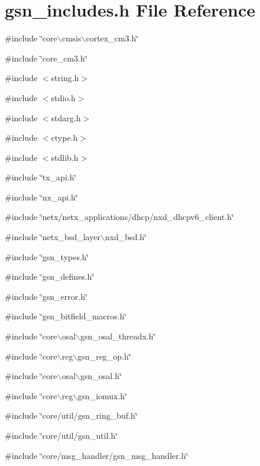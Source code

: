 \hypertarget{a00518}{
\section{gsn\_\-includes.h File Reference}
\label{a00518}
}
{\ttfamily \#include \char`\"{}core$\backslash$cmsis$\backslash$cortex\_\-cm3.h\char`\"{}}\par
{\ttfamily \#include \char`\"{}core\_\-cm3.h\char`\"{}}\par
{\ttfamily \#include $<$string.h$>$}\par
{\ttfamily \#include $<$stdio.h$>$}\par
{\ttfamily \#include $<$stdarg.h$>$}\par
{\ttfamily \#include $<$ctype.h$>$}\par
{\ttfamily \#include $<$stdlib.h$>$}\par
{\ttfamily \#include \char`\"{}tx\_\-api.h\char`\"{}}\par
{\ttfamily \#include \char`\"{}nx\_\-api.h\char`\"{}}\par
{\ttfamily \#include \char`\"{}netx/netx\_\-applications/dhcp/nxd\_\-dhcpv6\_\-client.h\char`\"{}}\par
{\ttfamily \#include \char`\"{}netx\_\-bsd\_\-layer$\backslash$nxd\_\-bsd.h\char`\"{}}\par
{\ttfamily \#include \char`\"{}gsn\_\-types.h\char`\"{}}\par
{\ttfamily \#include \char`\"{}gsn\_\-defines.h\char`\"{}}\par
{\ttfamily \#include \char`\"{}gsn\_\-error.h\char`\"{}}\par
{\ttfamily \#include \char`\"{}gsn\_\-bitfield\_\-macros.h\char`\"{}}\par
{\ttfamily \#include \char`\"{}core$\backslash$osal$\backslash$gsn\_\-osal\_\-threadx.h\char`\"{}}\par
{\ttfamily \#include \char`\"{}core$\backslash$reg$\backslash$gsn\_\-reg\_\-op.h\char`\"{}}\par
{\ttfamily \#include \char`\"{}core$\backslash$osal$\backslash$gsn\_\-osal.h\char`\"{}}\par
{\ttfamily \#include \char`\"{}core$\backslash$reg$\backslash$gsn\_\-iomux.h\char`\"{}}\par
{\ttfamily \#include \char`\"{}core/util/gsn\_\-ring\_\-buf.h\char`\"{}}\par
{\ttfamily \#include \char`\"{}core/util/gsn\_\-util.h\char`\"{}}\par
{\ttfamily \#include \char`\"{}core/msg\_\-handler/gsn\_\-msg\_\-handler.h\char`\"{}}\par
